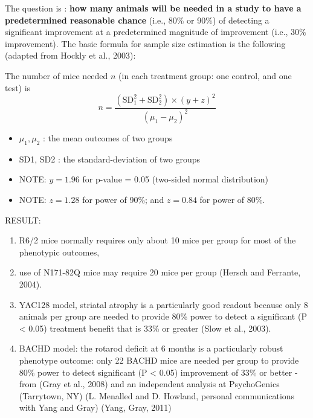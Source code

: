 The question is : {\bf how many animals will be needed in a study to have a
predetermined reasonable chance} (i.e., 80\% or 90\%) of detecting a significant
improvement at a predetermined magnitude of improvement (i.e., 30\%
improvement). The basic formula for sample size estimation is the following
(adapted from Hockly et al., 2003):

The number of mice needed $n$ (in each treatment group: one control, and one
test) is
\begin{equation}
n = \frac{(\text{SD}_1^2 + \text{SD}_2^2) \times (y + z)^2  }{(\mu_1 - \mu_2)^2}
\end{equation}
\begin{itemize}
  \item $\mu_1, \mu_2$ : the mean outcomes of two groups
  
  \item SD1, SD2 : the standard-deviation of two groups
  
  \item NOTE: $y=1.96$ for p-value = 0.05 (two-sided normal distribution)
  
  \item NOTE: $z=1.28$ for power of 90\%; and $z=0.84$ for power of 80\%.
\end{itemize}

RESULT:
\begin{enumerate}
  \item R6/2 mice normally requires only about 10 mice per group for most of the phenotypic
outcomes,

  \item use of N171-82Q mice may require 20 mice per group (Hersch and Ferrante,
  2004). 
  
  \item YAC128 model, striatal atrophy is a particularly good readout because
  only 8 animals per group are needed to provide 80\% power to detect a
  significant (P < 0.05) treatment benefit that is 33\% or greater (Slow et al.,
  2003).

  \item BACHD model: the rotarod deficit at 6 months is a particularly robust
  phenotype outcome: only 22 BACHD mice are needed per group to provide 80\%
  power to detect significant (P < 0.05) improvement of 33\% or better - from
  (Gray et al., 2008) and an independent analysis at PsychoGenics (Tarrytown,
  NY) (L. Menalled and D. Howland, personal communications with Yang and Gray)
  (Yang, Gray, 2011)
\end{enumerate}




